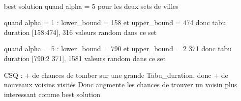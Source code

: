 \documentclass[12pt,oneside,a4paper]{article}
\begin{document}
\paragraph{}
best solution quand alpha = 5 pour les deux sets de villes

quand alpha = 1 : lower\_bound = 158 et upper\_bound = 474
donc tabu duration [158:474], 316 valeurs random dans ce set

quand alpha = 5 : lower\_bound = 790 et upper\_bound = 2 371
donc tabu duration [790:2 371], 1581 valeurs random dans ce set

CSQ : + de chances de tomber sur une grande Tabu\_duration, donc + de nouveaux voisins visités 
Donc augmente les chances  de trouver un voisin plus interessant comme best solution
\end{document}
